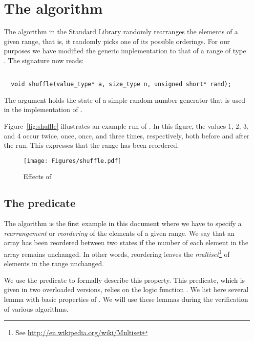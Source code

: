
\section{The \shuffle algorithm}

The \shuffle  algorithm in the \cxx Standard Library \cite[\S 28.6.13]{cxx-17-draft}
randomly rearranges the elements of a given range, that is,
it randomly picks one of its possible orderings.
For our purposes we have modified
the generic implementation
to that of a range of type .
The signature now reads:

\begin{lstlisting}[style=acsl-block]

  void shuffle(value_type* a, size_type n, unsigned short* rand);
\end{lstlisting}

The argument  holds the state of a simple random number generator
that is used in the implementation of \shuffle.

Figure~\ref{fig:shuffle} illustrates an example run of \shuffle.
In this figure, the values 1, 2, 3, and 4 occur 
twice, once, once, and three times, respectively, both before and
after the \shuffle run.
This expresses that the range has been reordered.

\begin{figure}[hbt]
\centering
\texttt{[image: Figures/shuffle.pdf]}
\caption{ Effects of \shuffle}
\end{figure}

\clearpage

\subsection{The predicate \MultisetReorder}

The \shuffle algorithm is the first example in this document
where we have to specify a \emph{rearrangement} or \emph{reordering}
of the elements of a given range.
We say that an array has been reordered between two states
if the number of each element in the array remains unchanged.
In other words, reordering leaves the \emph{multiset}\footnote{
 See \url{http://en.wikipedia.org/wiki/Multiset}
}
of elements in the range unchanged.

We use the predicate  
to formally describe this property.
This predicate, which is given in two overloaded versions,
relies on the logic function .
We list here several lemma with basic properties of \MultisetReorder.
We will use these lemmas during the verification of various algorithms.

